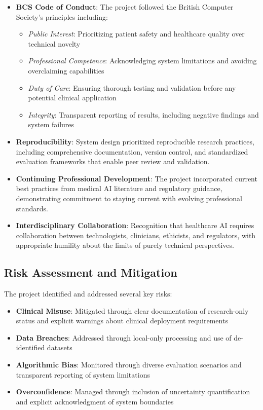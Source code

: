 \begin{itemize}
    \item \textbf{BCS Code of Conduct}: The project followed the British Computer Society's principles including:
    \begin{itemize}
        \item \textit{Public Interest}: Prioritizing patient safety and healthcare quality over technical novelty
        \item \textit{Professional Competence}: Acknowledging system limitations and avoiding overclaiming capabilities
        \item \textit{Duty of Care}: Ensuring thorough testing and validation before any potential clinical application
        \item \textit{Integrity}: Transparent reporting of results, including negative findings and system failures
    \end{itemize}
    
    \item \textbf{Reproducibility}: System design prioritized reproducible research practices, including comprehensive documentation, version control, and standardized evaluation frameworks that enable peer review and validation.
    
    \item \textbf{Continuing Professional Development}: The project incorporated current best practices from medical AI literature and regulatory guidance, demonstrating commitment to staying current with evolving professional standards.
    
    \item \textbf{Interdisciplinary Collaboration}: Recognition that healthcare AI requires collaboration between technologists, clinicians, ethicists, and regulators, with appropriate humility about the limits of purely technical perspectives.
\end{itemize}

\subsection{Risk Assessment and Mitigation}

The project identified and addressed several key risks:

\begin{itemize}
    \item \textbf{Clinical Misuse}: Mitigated through clear documentation of research-only status and explicit warnings about clinical deployment requirements
    \item \textbf{Data Breaches}: Addressed through local-only processing and use of de-identified datasets
    \item \textbf{Algorithmic Bias}: Monitored through diverse evaluation scenarios and transparent reporting of system limitations
    \item \textbf{Overconfidence}: Managed through inclusion of uncertainty quantification and explicit acknowledgment of system boundaries
\end{itemize}

